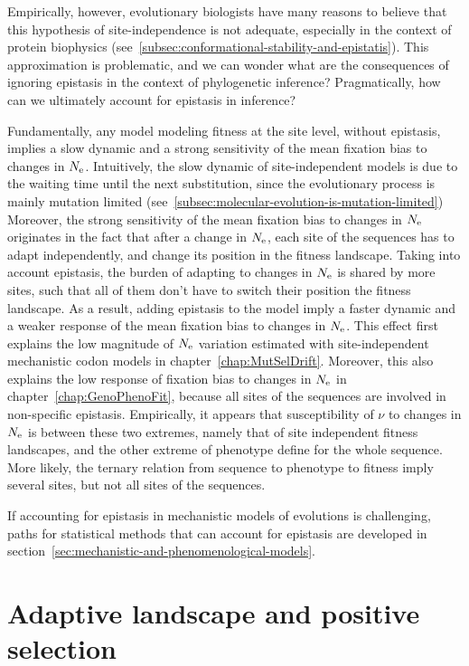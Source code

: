 Empirically, however, evolutionary biologists have many reasons to believe that this hypothesis of site-independence is not adequate, especially in the context of protein biophysics (see~\ref{subsec:conformational-stability-and-epistatis}).
This approximation is problematic, and we can wonder what are the consequences of ignoring epistasis in the context of phylogenetic inference?
Pragmatically, how can we ultimately account for epistasis in inference?

Fundamentally, any model modeling fitness at the site level, without epistasis, implies a slow dynamic and a strong sensitivity of the mean fixation bias to changes in $N_{\textrm{e}}$.
Intuitively, the slow dynamic of site-independent models is due to the waiting time until the next substitution, since the evolutionary process is mainly mutation limited (see~\ref{subsec:molecular-evolution-is-mutation-limited})
Moreover, the strong sensitivity of the mean fixation bias to changes in $N_{\textrm{e}}$ originates in the fact that after a change in $N_{\textrm{e}}$, each site of the sequences has to adapt independently, and change its position in the fitness landscape.
Taking into account epistasis, the burden of adapting to changes in $N_{\textrm{e}}$ is shared by more sites, such that all of them don't have to switch their position the fitness landscape.
As a result, adding epistasis to the model imply a faster dynamic and a weaker response of the mean fixation bias to changes in $N_{\textrm{e}}$.
This effect first explains the low magnitude of $N_{\textrm{e}}$ variation estimated with site-independent mechanistic codon models in chapter~\ref{chap:MutSelDrift}.
Moreover, this also explains the low response of fixation bias to changes in $N_{\textrm{e}}$ in chapter~\ref{chap:GenoPhenoFit}, because all sites of the sequences are involved in non-specific epistasis.
Empirically, it appears that susceptibility of $\nu$ to changes in $N_{\textrm{e}}$ is between these two extremes, namely that of site independent fitness landscapes, and the other extreme of phenotype define for the whole sequence.
More likely, the ternary relation from sequence to phenotype to fitness imply several sites, but not all sites of the sequences.

If accounting for epistasis in mechanistic models of evolutions is challenging, paths for statistical methods that can account for epistasis are developed in section~\ref{sec:mechanistic-and-phenomenological-models}.


\section{Adaptive landscape and positive selection}
\label{sec:adaptative-landscape}

